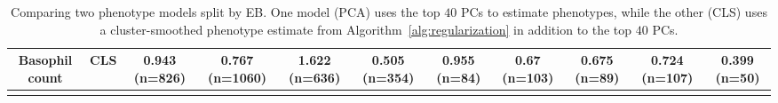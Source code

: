 \begin{landscape}
\begin{table}[!htbp]
\begin{tabular}{ ccccccccccc}
Basophil count & CLS & 0.943 (n=826) & 0.767 (n=1060) & 1.622 (n=636) & 0.505 (n=354) & 0.955 (n=84) & 0.67 (n=103) & 0.675 (n=89) & 0.724 (n=107) & 0.399 (n=50) \\ 
\hline \\[-1.8ex] 
\end{tabular} 
\caption[Comparing phenotype models by EB (2)]{Comparing two phenotype models split by EB. One model (PCA) uses the top $40$ PCs to estimate phenotypes, while the other (CLS) uses a cluster-smoothed phenotype estimate from Algorithm~\ref{alg:regularization} in addition to the top $40$ PCs.}
  \label{table:supp_mse2} 
\end{table} 

\end{landscape}

\clearpage